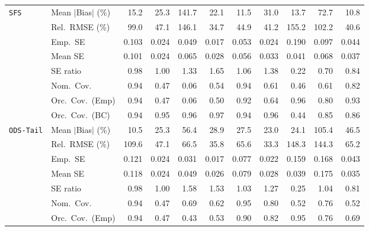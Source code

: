 \begin{landscape}
\begin{longtable}{llrrrrrrrrr}
\addlinespace[2pt]
\quad \texttt{SFS} & Mean $|$Bias$|$ (\%) & 15.2 & 25.3 & 141.7 & 22.1 & \cellcolor{ranktwo}11.5 & 31.0 & \cellcolor{rankthree}13.7 & 72.7 & \cellcolor{rankone}10.8 \\
 & Rel.\ RMSE (\%) & 99.0 & 47.1 & 146.1 & \cellcolor{rankone}34.7 & 44.9 & \cellcolor{rankthree}41.2 & 155.2 & 102.2 & \cellcolor{ranktwo}40.6 \\
 & Emp.\ SE & 0.103 & 0.024 & 0.049 & 0.017 & 0.053 & 0.024 & 0.190 & 0.097 & 0.044 \\
 & Mean SE & 0.101 & 0.024 & 0.065 & 0.028 & 0.056 & 0.033 & 0.041 & 0.068 & 0.037 \\
 & SE ratio & \cellcolor{ranktwo}0.98 & \cellcolor{rankone}1.00 & 1.33 & 1.65 & \cellcolor{rankthree}1.06 & 1.38 & 0.22 & 0.70 & 0.84 \\
 & Nom.\ Cov. & \cellcolor{rankone}0.94 & 0.47 & 0.06 & 0.54 & \cellcolor{rankone}0.94 & \cellcolor{rankthree}0.61 & 0.46 & \cellcolor{rankthree}0.61 & \cellcolor{ranktwo}0.82 \\
 & Orc.\ Cov.\ (Emp) & \cellcolor{rankone}0.94 & 0.47 & 0.06 & 0.50 & \cellcolor{rankthree}0.92 & 0.64 & \cellcolor{rankone}0.96 & 0.80 & \cellcolor{ranktwo}0.93 \\
 & Orc.\ Cov.\ (BC) & \cellcolor{rankone}0.94 & \cellcolor{rankone}0.95 & \cellcolor{rankone}0.96 & \cellcolor{ranktwo}0.97 & \cellcolor{rankone}0.94 & \cellcolor{rankone}0.96 & 0.44 & 0.85 & \cellcolor{rankthree}0.86 \\
\addlinespace[2pt]
\quad \texttt{ODS-Tail} & Mean $|$Bias$|$ (\%) & \cellcolor{rankone}10.5 & 25.3 & 56.4 & 28.9 & 27.5 & \cellcolor{ranktwo}23.0 & \cellcolor{rankthree}24.1 & 105.4 & 46.5 \\
 & Rel.\ RMSE (\%) & 109.6 & \cellcolor{rankthree}47.1 & 66.5 & \cellcolor{ranktwo}35.8 & 65.6 & \cellcolor{rankone}33.3 & 148.3 & 144.3 & 65.2 \\
 & Emp.\ SE & 0.121 & 0.024 & 0.031 & 0.017 & 0.077 & 0.022 & 0.159 & 0.168 & 0.043 \\
 & Mean SE & 0.118 & 0.024 & 0.049 & 0.026 & 0.079 & 0.028 & 0.039 & 0.175 & 0.035 \\
 & SE ratio & \cellcolor{ranktwo}0.98 & \cellcolor{rankone}1.00 & 1.58 & 1.53 & \cellcolor{rankthree}1.03 & 1.27 & 0.25 & 1.04 & 0.81 \\
 & Nom.\ Cov. & \cellcolor{ranktwo}0.94 & 0.47 & 0.69 & 0.62 & \cellcolor{rankone}0.95 & \cellcolor{rankthree}0.80 & 0.52 & 0.76 & 0.52 \\
 & Orc.\ Cov.\ (Emp) & \cellcolor{ranktwo}0.94 & 0.47 & 0.43 & 0.53 & \cellcolor{rankthree}0.90 & 0.82 & \cellcolor{rankone}0.95 & 0.76 & 0.69 \\

\end{longtable}
\end{landscape}
